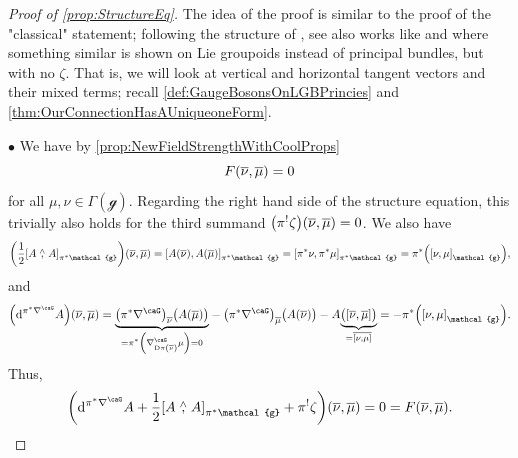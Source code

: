 \documentclass[reqno,a4paper,oneside]{amsart}
\theoremstyle{plain}
\theoremstyle{remark}
\theoremstyle{definition}
\begin{document}
\begin{proof}[Proof of \ref{prop:StructureEq}]
\leavevmode\newline
The idea of the proof is similar to the proof of the "classical" statement; following the structure of \cite[\S 5.5, Lemma 5.5.5, page 276]{Hamilton}, see also works like \cite[\S 4.6, Lemma 4.25]{LAURENTGENGOUXStienonXuMultiplicativeForms} and \cite[\S 2.5, Prop.\ 2.24]{FernandesMarcutMultiplicativeForms} where something similar is shown on Lie groupoids instead of principal bundles, but with no $\zeta$. That is, we will look at vertical and horizontal tangent vectors and their mixed terms; recall \ref{def:GaugeBosonsOnLGBPrincies} and \ref{thm:OurConnectionHasAUniqueoneForm}.

$\bullet$ We have by \ref{prop:NewFieldStrengthWithCoolProps}
\begin{equation*}
F\mleft( \overline{\nu}, \overline{\mu} \mright)
=
0
\end{equation*}
for all $\mu, \nu \in \Gamma(\mathcal{g})$. Regarding the right hand side of the structure equation, this trivially also holds for the third summand $\mleft(\pi^!\zeta\mright)\mleft( \overline{\nu}, \overline{\mu} \mright) = 0$. We also have
\begin{equation*}
\mleft(\frac{1}{2} \mleft[ A \stackrel{\wedge}{,} A \mright]_{\pi^*\mathcal{g}}\mright)\mleft( \overline{\nu}, \overline{\mu} \mright)
=
\mleft[ A\mleft( \overline{\nu} \mright), A\mleft( \overline{\mu} \mright) \mright]_{\pi^*\mathcal{g}}
=
\mleft[ \pi^*\nu, \pi^*\mu \mright]_{\pi^*\mathcal{g}}
=
\pi^*\mleft( \mleft[ \nu, \mu \mright]_{\mathcal{g}} \mright),
\end{equation*}
and
\begin{equation*}
\mleft(\mathrm{d}^{\pi^*\nabla^\caG} A\mright)\mleft( \overline{\nu}, \overline{\mu} \mright)
=
{\underbrace{\mleft(\pi^*\nabla^\caG\mright)_{\overline{\nu}} \bigl(A\mleft( \overline{\mu} \mright) \bigr)}_{\mathclap{ = \pi^*\mleft( \nabla^\caG_{\mathrm{D}\pi\mleft( \overline{\nu} \mright)} \mu \mright) = 0 }}}
	- \mleft(\pi^*\nabla^\caG\mright)_{\overline{\mu}} \bigl(A\mleft( \overline{\nu} \mright) \bigr)
	- A {\underbrace{\bigl( \mleft[ \overline{\nu}, \overline{\mu} \mright] \bigr)}_{= \overline{[\nu, \mu]}}}
=
- \pi^*\mleft( \mleft[ \nu, \mu \mright]_{\mathcal{g}} \mright).
\end{equation*}
Thus,
\begin{equation*}
\mleft(
	\mathrm{d}^{\pi^*\nabla^\caG} A
	+ \frac{1}{2} \mleft[ A \stackrel{\wedge}{,} A \mright]_{\pi^*\mathcal{g}}
	+ \pi^!\zeta
\mright)\mleft( \overline{\nu}, \overline{\mu} \mright)
=
0
=
F\mleft( \overline{\nu}, \overline{\mu} \mright).
\end{equation*}


\end{proof}
\end{document}
